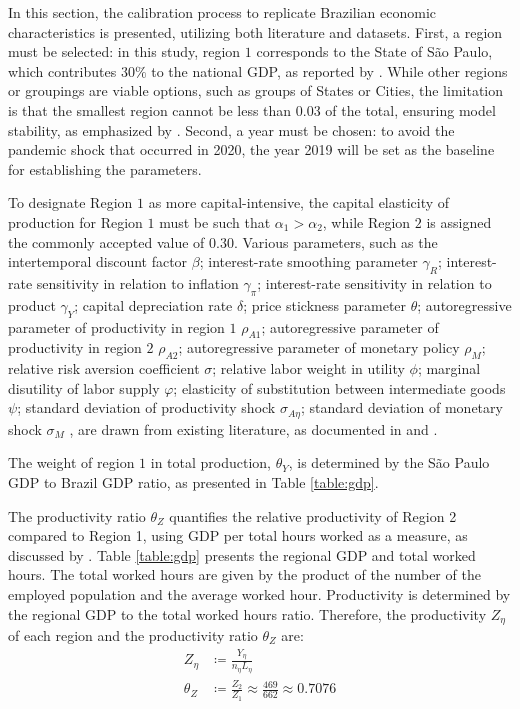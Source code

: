 \documentclass[../thesis.tex]{subfiles}
\begin{document}
In this section, the calibration process to replicate Brazilian economic characteristics is presented, utilizing both literature and datasets. First, a region must be selected: in this study, region $1$ corresponds to the State of São Paulo, which contributes $30\%$ to the national GDP, as reported by \textcite{ibge_GDP_2023}. While other regions or groupings are viable options, such as groups of States or Cities, the limitation is that the smallest region cannot be less than $0.03$ of the total, ensuring model stability, as emphasized by \textcite{konopkova_pitfalls_2019}. Second, a year must be chosen: to avoid the pandemic shock that occurred in 2020, the year 2019 will be set as the baseline for establishing the parameters. \textcolor{blue}{}

\textcolor{blue}{}To designate Region $1$ as more capital-intensive, the capital elasticity of production for Region $1$ must be such that $\alpha_{1} > \alpha_{2}$, while Region $2$ is assigned the commonly accepted value of $0.30$. Various parameters, such as the 
intertemporal discount factor $\beta$; 
interest-rate smoothing parameter $\gamma_{R}$; 
interest-rate sensitivity in relation to inflation $\gamma_{\pi}$; 
interest-rate sensitivity in relation to product $\gamma_{Y}$; 
capital depreciation rate $\delta$; 
price stickness parameter $\theta$;
autoregressive parameter of productivity in region $1$ $\rho_{A1}$;
autoregressive parameter of productivity in region $2$ $\rho_{A2}$;
autoregressive parameter of monetary policy $\rho_{M}$;
relative risk aversion coefficient $\sigma$;
relative labor weight in utility $\phi$;
marginal disutility of labor supply $\varphi$;
elasticity of substitution between intermediate goods $\psi$;
standard deviation of productivity shock $\sigma_{A\eta}$;
standard deviation of monetary shock $\sigma_{M}$
, are drawn from existing literature, as documented in \textcite{costa_junior_understanding_2016} and \textcite{pereira_rbc_2021}.

The weight of region $1$ in total production, $\theta_{Y}$, is determined by the São Paulo GDP to Brazil GDP ratio, as presented in Table \eqref{table:gdp}.

\textcolor{blue}{}The productivity ratio $\theta_{Z}$ quantifies the relative productivity of Region 2 compared to Region 1, using GDP per total hours worked as a measure, as discussed by \textcite{krugman_defining_1997}. Table \eqref{table:gdp} presents the regional GDP and total worked hours. The total worked hours are given by the product of the number of the employed population and the average worked hour. Productivity is determined by the regional GDP to the total worked hours ratio. Therefore, the productivity $Z_{\eta}$ of each region and the productivity ratio $\theta_{Z}$ are:
\begin{align}
	Z_{\eta}  &\coloneqq \frac{Y_{\eta}}{n_{\eta} L_{\eta}} \\
	\theta_{Z} &\coloneqq \frac{Z_{2}}{Z_{1}} \approx \frac{469}{662} \approx 0.7076
\end{align}
\end{document}
